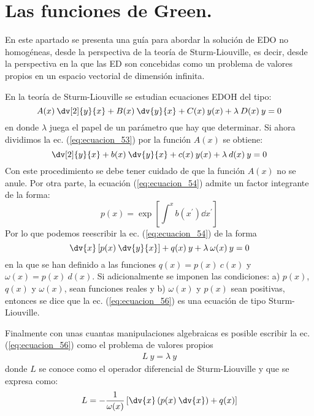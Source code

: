 \section{Las funciones de Green.}
En este apartado se presenta una guía para abordar la solución de EDO no homogéneas, desde la perspectiva de la teoría de Sturm-Liouville, es decir, desde la perspectiva en la que las ED son concebidas como un problema de valores propios en un espacio vectorial de dimensión infinita.
\par
En la teoría de Sturm-Liouville se estudian ecuaciones EDOH del tipo:
\begin{equation}
A(x) \: \dv[2]{y}{x} + B(x) \: \dv{y}{x} + C(x) \: y(x) +  \lambda \: D(x) \: y = 0
\label{eq:ecuacion_53}
\end{equation}
en donde $\lambda$ juega el papel de un parámetro que hay que determinar. Si ahora dividimos la ec. (\ref{eq:ecuacion_53}) por la función $A(x)$ se obtiene:
\begin{equation}
\dv[2]{y}{x} + b(x) \: \dv{y}{x} + c(x) \: y(x) +  \lambda \: d(x) \: y = 0
\label{eq:ecuacion_54}
\end{equation}
Con este procedimiento se debe tener cuidado de que la función $A(x)$ no se anule. Por otra parte, la ecuación (\ref{eq:ecuacion_54}) admite un factor integrante de la forma:
\begin{equation}
p(x) = \exp \left[ \int^{x} b(x^{\prime}) \dd{x^{\prime}} \right]
\label{eq:ecuacion_55}
\end{equation}
Por lo que podemos reescribir la ec. (\ref{eq:ecuacion_54}) de la forma
\begin{equation}
\dv{x} \left[ p(x) \: \dv{y}{x} \right] + q(x) \: y + \lambda \: \omega(x) \: y = 0
\label{eq:ecuacion_56}
\end{equation}
en la que se han definido a las funciones $q(x) = p(x) \: c(x)$ y $\omega (x) = p(x) \: d(x)$. Si adicionalmente se imponen las condiciones: a) $p(x)$, $q(x)$ y $\omega (x)$, sean funciones reales y b) $\omega(x)$ y $p(x)$ sean positivas, entonces se dice que la ec. (\ref{eq:ecuacion_56}) es una ecuación de tipo Sturm-Liouville.
\par
Finalmente con unas cuantas manipulaciones algebraicas es posible escribir la ec. (\ref{eq:ecuacion_56}) como el problema de valores propios 
\begin{align*}
L \: y = \lambda \:y
\end{align*}
 donde $L$ se conoce como el operador diferencial de Sturm-Liouville y que se expresa como:
 \begin{align*}
L = - \dfrac{1}{\omega (x)} \left[ \dv{x} \left( p(x) \: \dv{x} \right) + q(x) \right]
 \end{align*}
